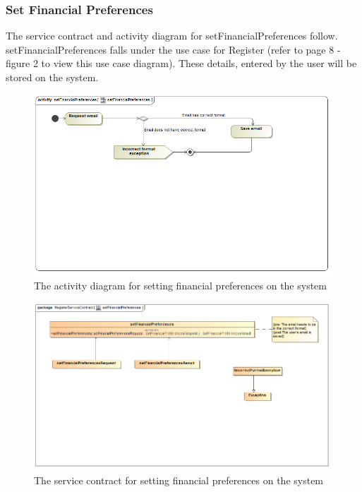 \documentclass[a4paper,12pt]{report}
\begin{document}
\subsubsection{Set Financial Preferences }
The service contract and activity diagram for setFinancialPreferences follow. setFinancialPreferences falls under the use case for Register (refer to page 8 - figure 2 to view this use case diagram). These details, entered by the user will be stored on the system.
\begin{figure}[H]
  \centering
    \includegraphics[width=1.0\textwidth]{../Diagrams/Register/ActivityDiagrams/setFinancialPreferences1.png}
    \caption{The activity diagram for setting financial preferences on the system} 
\end{figure}
\begin{figure}[H]
  \centering
    \includegraphics[width=1.0\textwidth]{../Diagrams/Register/ServiceContractsRegister/setFinancialPreferencesServiceContract.png}
    \caption{The service contract for setting financial preferences on the system} 
\end{figure}
\end{document}
